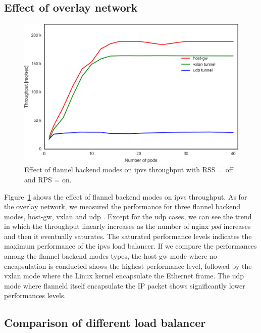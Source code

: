 \subsection{Effect of overlay network}

\begin{figure}
  \centering
  \includegraphics[width=0.8\columnwidth]{Figs/ipvs_flannel_mode}
  \caption{Effect of flannel backend modes on ipvs throughput with RSS = off and RPS = on.}
  \label{fig:ipvs_flannel_mode}
\end{figure}

Figure~\ref{fig:ipvs_flannel_mode} shows the effect of flannel backend modes on ipvs throughput.
As for the overlay network, we measured the performance for three flannel backend modes, host-gw, vxlan and udp .
Except for the udp cases, we can see the trend in which the throughput linearly increases 
as the number of nginx {\em pod} increases and then it eventually saturates.
The saturated performance levels indicates the maximum performance of the ipvs load balancer.
If we compare the performances among the flannel backend modes types, 
the host-gw mode where no encapsulation is conducted shows the highest performance level,
followed by the vxlan mode where the Linux kernel encapsulate the Ethernet frame.
The udp mode where flanneld itself encapsulate the IP packet shows significantly lower performances levels.

\subsection{Comparison of different load balancer}

